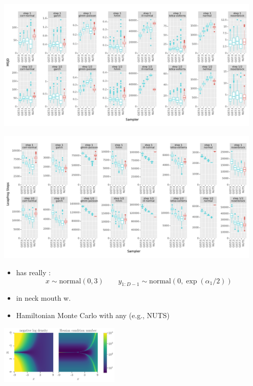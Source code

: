 \documentclass[10pt]{report}
\begin{document}
\vspace*{-9pt}
\begin{center}
  \includegraphics[width=0.95\textwidth]{img/vs_NUTS_MSJD.pdf}
\end{center}

\vspace*{-9pt}
\begin{center}
  \includegraphics[width=0.95\textwidth]{img/vs_NUTS_Leapfrog_Steps.pdf}
\end{center}

\begin{itemize}
\item {} has really :
$$
    x \sim \textrm{normal}(0, 3)
\qquad
y_{1:D-1} \sim \textrm{normal}(0, \exp(\alpha_1 / 2))
$$
\item {} in neck  mouth w. 
\item Hamiltonian Monte Carlo with any 
  (e.g., NUTS)
\end{itemize}
\begin{center}
  \includegraphics[width=2.25in]{img/funnel_density_hessian.png}
\end{center}
  
\end{document}
